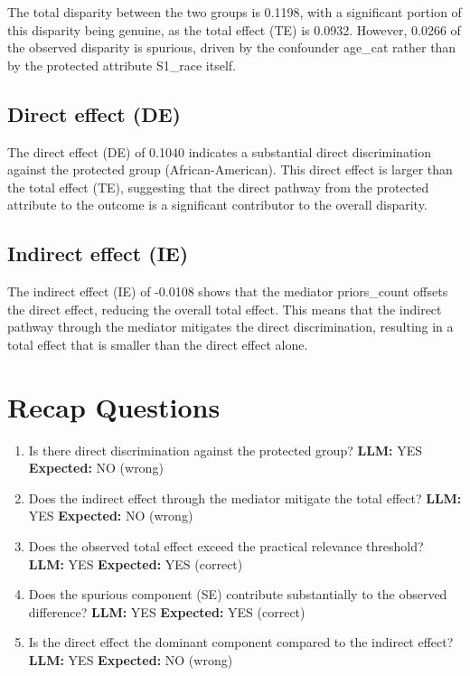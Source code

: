 \documentclass[11pt]{article}
\begin{document}
The total disparity between the two groups is 0.1198, with a significant portion of this disparity being genuine, as the total effect (TE) is 0.0932. However, 0.0266 of the observed disparity is spurious, driven by the confounder age\_cat rather than by the protected attribute S1\_race itself.

\subsection{Direct effect (DE)}

The direct effect (DE) of 0.1040 indicates a substantial direct discrimination against the protected group (African-American). This direct effect is larger than the total effect (TE), suggesting that the direct pathway from the protected attribute to the outcome is a significant contributor to the overall disparity.

\subsection{Indirect effect (IE)}

The indirect effect (IE) of -0.0108 shows that the mediator priors\_count offsets the direct effect, reducing the overall total effect. This means that the indirect pathway through the mediator mitigates the direct discrimination, resulting in a total effect that is smaller than the direct effect alone.

\section{Recap Questions}

\begin{enumerate}
\item Is there direct discrimination against the protected group? \textbf{LLM:} YES \quad \textbf{Expected:} NO \quad (wrong)
\item Does the indirect effect through the mediator mitigate the total effect? \textbf{LLM:} YES \quad \textbf{Expected:} NO \quad (wrong)
\item Does the observed total effect exceed the practical relevance threshold? \textbf{LLM:} YES \quad \textbf{Expected:} YES \quad (correct)
\item Does the spurious component (SE) contribute substantially to the observed difference? \textbf{LLM:} YES \quad \textbf{Expected:} YES \quad (correct)
\item Is the direct effect the dominant component compared to the indirect effect? \textbf{LLM:} YES \quad \textbf{Expected:} NO \quad (wrong)
\end{enumerate}
\end{document}
